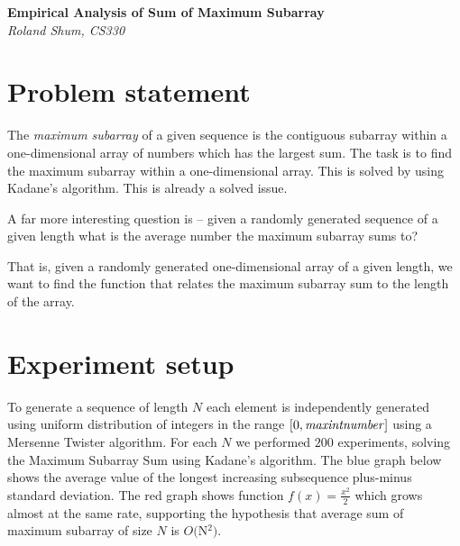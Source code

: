 \documentclass{article}
\begin{document}
\begin{titlepage}
   \begin{center}
      \Large\textbf{Empirical Analysis of Sum of Maximum Subarray}\\
      \large\textit{Roland Shum, CS330}
   \end{center}
\end{titlepage}

\section{Problem statement}

The {\it maximum subarray} of a given sequence
is the contiguous subarray within a one-dimensional array of numbers which has the largest sum.
The task is to find the maximum subarray within a one-dimensional array. This is solved by using
Kadane's algorithm. This is already a solved issue. \newline

A far more interesting question is -- given a randomly generated sequence of a given length what is 
the average number the maximum subarray sums to? \newline

That is, given a randomly generated one-dimensional array of a given length, we want to find the function that relates 
the maximum subarray sum to the length of the array.

\section{Experiment setup}
To generate a sequence of length $N$ each element is independently generated
using uniform distribution of integers in the range $[0, {\it max int number}]$ using a Mersenne Twister algorithm.
For each $N$ we performed $200$ experiments, solving the Maximum Subarray Sum using Kadane's algorithm. 
The blue graph below shows the average value of the longest increasing subsequence plus-minus standard deviation.
The red graph shows function $f(x) = \frac{x^2}{2}$ which grows almost at the same rate, supporting 
the hypothesis that average sum of maximum subarray of size $N$
is $O($N$^2)$.
\end{document}
